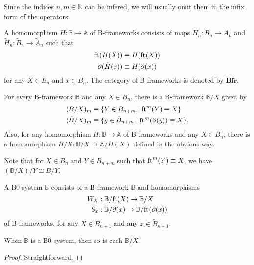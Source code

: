 \begin{rmk}
Since the indices $n,m\in\mathbb{N}$ can be infered, we will usually omit them
in the infix form of the operators.
\end{rmk}

\begin{defn}
A homomorphism $H:\mathbb{B}\to\mathbb{A}$ of B-frameworks consists of maps
$H_n:B_n\to A_n$ and $\tilde{H}_n:\tilde{B}_n\to\tilde{A}_n$ such that
\begin{align*}
\mathrm{ft}_{}(H(X)) & \equiv H(\mathrm{ft}_{}(X)) \\
\partial_{}(\tilde{H}(x)) & \equiv H(\partial_{}(x))
\end{align*}
for any $X\in B_n$ and $x\in\tilde{B}_n$. The category of B-frameworks is
denoted by $\mathbf{Bfr}$. 
\end{defn}

\begin{defn}
For every B-framework $\mathbb{B}$ and any $X\in B_n$, there is a B-framework
$\mathbb{B}/X$ given by
\begin{align*}
(B/X)_{m} & \equiv \{Y\in B_{n+m}\mid\mathrm{ft}_{}^{m}(Y)\equiv X\}\\
(\tilde{B}/X)_m & \equiv \{y\in \tilde{B}_{n+m}\mid\mathrm{ft}_{}^m(\partial_{}(y))\equiv X\}.
\end{align*}
Also, for any homomorphism $H:\mathbb{B}\to\mathbb{A}$ of B-frameworks and any
$X\in B_n$, there is a homomorphism $H/X:\mathbb{B}/X\to\mathbb{A}/H(X)$
defined in the obvious way.
\end{defn}

\begin{rmk}
Note that for $X\in B_n$ and $Y\in B_{n+m}$ such that $\mathrm{ft}_{}^m(Y)\equiv X$, 
we have $(\mathbb{B}/X)/Y\cong B/Y$.
\end{rmk}

\begin{defn}
A B0-system $\mathbb{B}$ consists of a B-framework $\mathbb{B}$ and homomorphisms
\begin{align*}
W_{X} & : \mathbb{B}/\mathrm{ft}_{}(X)\to\mathbb{B}/X\\
S_{x} & : \mathbb{B}/\partial_{}(x)\to\mathbb{B}/\mathrm{ft}_{}(\partial_{}(x))
\end{align*}
of B-frameworks, for any $X\in B_{n+1}$ and any $x\in\tilde{B}_{n+1}$. 
\end{defn}

\begin{lem}
When $\mathbb{B}$ is a B0-system, then so is each $\mathbb{B}/X$.
\end{lem}

\begin{proof}
Straightforward.
\end{proof}

